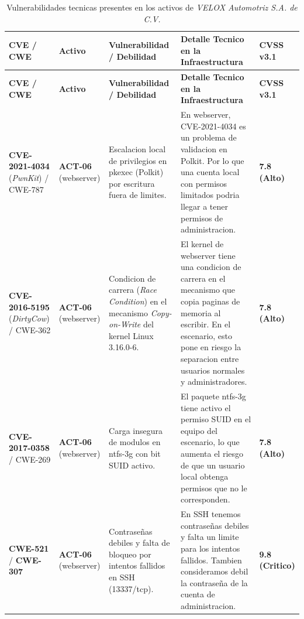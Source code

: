 \documentclass[letterpaper,11pt]{article}
\begin{document}
\begingroup
\scriptsize
\setlength{\tabcolsep}{4pt}
\renewcommand{\arraystretch}{1.28}
\noindent
\begin{longtable}{|C{2.3cm}|C{1.4cm}|L{3.6cm}|L{7.2cm}|C{1.8cm}|}
\caption{Vulnerabilidades tecnicas presentes en los activos de \textit{VELOX Automotriz S.A. de C.V.}}
\label{tab:vulnerabilidades} \\
\hline
{}
\textbf{CVE / CWE}
  & \textbf{Activo}
  & \textbf{Vulnerabilidad / Debilidad}
  & \textbf{Detalle Tecnico en la Infraestructura}
  & \textbf{CVSS v3.1} \\
\hline
\endfirsthead
\hline
{}
\textbf{CVE / CWE}
  & \textbf{Activo}
  & \textbf{Vulnerabilidad / Debilidad}
  & \textbf{Detalle Tecnico en la Infraestructura}
  & \textbf{CVSS v3.1} \\
\hline
\endhead
\hline
\endlastfoot

\textbf{CVE-2021-4034} (\textit{PwnKit}) / CWE-787
  & \textbf{ACT-06} (webserver)
  & Escalacion local de privilegios en pkexec (Polkit) por escritura
fuera de limites.
  & En webserver, CVE-2021-4034 es un problema de validacion en Polkit.
Por lo que una cuenta local con permisos limitados podria llegar a
tener permisos de administracion.
  & \textbf{7.8 (Alto)} \\
\hline

\textbf{CVE-2016-5195} (\textit{DirtyCow}) / CWE-362
  & \textbf{ACT-06} (webserver)
  & Condicion de carrera (\textit{Race Condition}) en el mecanismo
\textit{Copy-on-Write} del kernel Linux 3.16.0-6.
  & El kernel de webserver tiene una condicion de carrera en el
mecanismo que copia paginas de memoria al escribir. En el
escenario, esto pone en riesgo la separacion entre usuarios
normales y administradores.
  & \textbf{7.8 (Alto)} \\
\hline

\textbf{CVE-2017-0358} / CWE-269
  & \textbf{ACT-06} (webserver)
  & Carga insegura de modulos en ntfs-3g con bit SUID activo.
  & El paquete ntfs-3g tiene activo el permiso SUID en el equipo del
escenario, lo que aumenta el riesgo de que un usuario local obtenga
permisos que no le corresponden.
  & \textbf{7.8 (Alto)} \\
\hline

\textbf{CWE-521} / \textbf{CWE-307}
  & \textbf{ACT-06} (webserver)
  & Contraseñas debiles y falta de bloqueo por intentos fallidos en SSH
(13337/tcp).
  & En SSH tenemos contraseñas debiles y falta un limite para los
intentos fallidos. Tambien consideramos debil la contraseña de la
cuenta de administracion.
  & \textbf{9.8 (Critico)} \\
\hline


\end{longtable}
\end{document}
